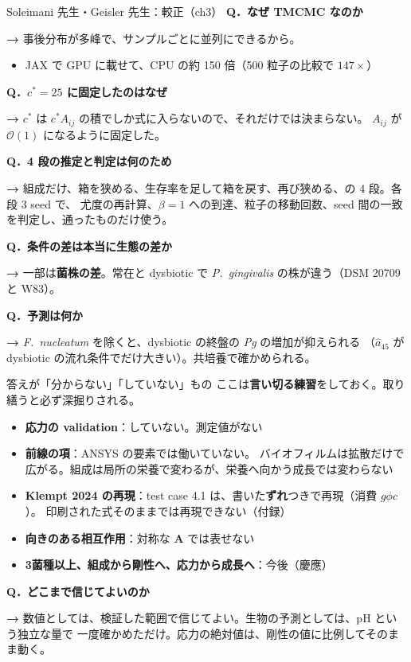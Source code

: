 \documentclass[aspectratio=169,11pt]{beamer}
\newcommand{\Q}[1]{\textbf{Q．#1}}
\newcommand{\A}[1]{\vspace{2pt}\colorbox{c3!10}{\parbox{0.95\linewidth}{%
  \small\textbf{→ }#1}}\vspace{3pt}}
\begin{document}
\begin{frame}[shrink=6]{Soleimani 先生・Geisler 先生：較正（ch3）}
\small\Q{なぜ TMCMC なのか}
\A{事後分布が多峰で、サンプルごとに並列にできるから。}
\begin{itemize}\footnotesize
  \item JAX で GPU に載せて、CPU の約 150 倍（500 粒子の比較で $147\times$）
\end{itemize}
\vspace{2pt}
\small\Q{$c^*=25$ に固定したのはなぜ}
\A{$c^*$ は $c^*A_{ij}$ の積でしか式に入らないので、それだけでは決まらない。
$A_{ij}$ が $\mathcal O(1)$ になるように固定した。}
\vspace{2pt}
\small\Q{4 段の推定と判定は何のため}
\A{組成だけ、箱を狭める、生存率を足して箱を戻す、再び狭める、の 4 段。各段 3 seed で、
尤度の再計算、$\beta=1$ への到達、粒子の移動回数、seed 間の一致を判定し、通ったものだけ使う。}
\vspace{2pt}
\small\Q{条件の差は本当に生態の差か}
\A{一部は\textbf{菌株の差}。常在と dysbiotic で \textit{P.~gingivalis} の株が違う（DSM 20709 と W83）。}
\vspace{2pt}
\small\Q{予測は何か}
\A{\textit{F.~nucleatum} を除くと、dysbiotic の終盤の \textit{Pg} の増加が抑えられる
（$\hat a_{45}$ が dysbiotic の流れ条件でだけ大きい）。共培養で確かめられる。}
\end{frame}

\begin{frame}{答えが「分からない」「していない」もの}
\small ここは\textbf{言い切る練習}をしておく。取り繕うと必ず深掘りされる。
\vspace{4pt}
\begin{itemize}\footnotesize
  \item \textbf{応力の validation}：\textcolor{copen}{していない}。測定値がない
  \item \textbf{前線の項}：ANSYS の要素では\textcolor{copen}{働いていない}。
        バイオフィルムは拡散だけで広がる。組成は局所の栄養で変わるが、栄養へ向かう成長では変わらない
  \item \textbf{Klempt 2024 の再現}：test case 4.1 は、書いた\textbf{ずれ}つきで再現（消費 $g\phi c$）。
        印刷された式そのままでは再現できない（付録）
  \item \textbf{向きのある相互作用}：対称な $\mathbf A$ では\textcolor{copen}{表せない}
  \item \textbf{3菌種以上、組成から剛性へ、応力から成長へ}：今後（慶應）
\end{itemize}
\vspace{6pt}
\small\Q{どこまで信じてよいのか}
\A{数値としては、検証した範囲で信じてよい。生物の予測としては、pH という独立な量で
一度確かめただけ。応力の絶対値は、剛性の値に比例してそのまま動く。}
\end{frame}
\end{document}
